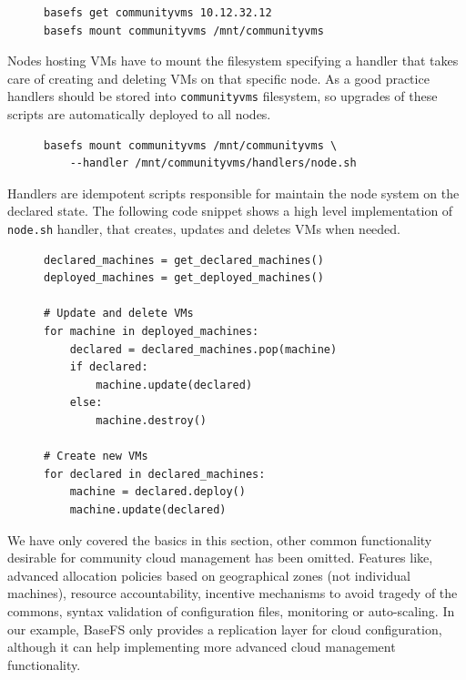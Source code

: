 \documentclass{sig-alternate}
\begin{document}
\begin{figure}[H]
\centering
\begin{BVerbatim}
basefs get communityvms 10.12.32.12
basefs mount communityvms /mnt/communityvms
\end{BVerbatim}
\end{figure}

Nodes hosting VMs have to mount the filesystem specifying a handler that takes care of creating and deleting VMs on that specific node. As a good practice handlers should be stored into \texttt{communityvms} filesystem, so upgrades of these scripts are automatically deployed to all nodes.

\begin{figure}[H]
\centering
\begin{BVerbatim}
basefs mount communityvms /mnt/communityvms \
    --handler /mnt/communityvms/handlers/node.sh
\end{BVerbatim}
\end{figure}

Handlers are idempotent scripts responsible for maintain the node system on the declared state. The following code snippet shows a high level implementation of \texttt{node.sh} handler, that creates, updates and deletes VMs when needed.

\begin{figure}[H]
\centering
\begin{BVerbatim}
declared_machines = get_declared_machines()
deployed_machines = get_deployed_machines()

# Update and delete VMs
for machine in deployed_machines:
    declared = declared_machines.pop(machine)
    if declared:
        machine.update(declared)
    else:
        machine.destroy()

# Create new VMs
for declared in declared_machines:
    machine = declared.deploy()
    machine.update(declared)
\end{BVerbatim}
\end{figure}

We have only covered the basics in this section, other common functionality desirable for community cloud management has been omitted. Features like, advanced allocation policies based on geographical zones (not individual machines), resource accountability, incentive mechanisms to avoid tragedy of the commons, syntax validation of configuration files, monitoring or auto-scaling. In our example, BaseFS only provides a replication layer for cloud configuration, although it can help implementing more advanced cloud management functionality.
\end{document}
